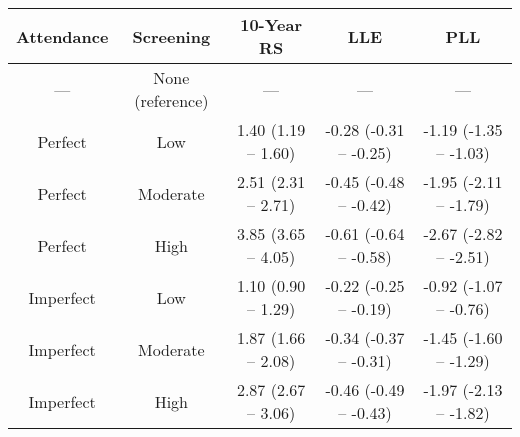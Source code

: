 
\begin{tabular}{ccccc}
\toprule
Attendance & Screening & 10-Year RS & LLE & PLL\\
\midrule
--- & None (reference) & --- & --- & ---\\
Perfect & Low & 1.40 (1.19 -- 1.60) & -0.28 (-0.31 -- -0.25) & -1.19 (-1.35 -- -1.03)\\
Perfect & Moderate & 2.51 (2.31 -- 2.71) & -0.45 (-0.48 -- -0.42) & -1.95 (-2.11 -- -1.79)\\
Perfect & High & 3.85 (3.65 -- 4.05) & -0.61 (-0.64 -- -0.58) & -2.67 (-2.82 -- -2.51)\\
Imperfect & Low & 1.10 (0.90 -- 1.29) & -0.22 (-0.25 -- -0.19) & -0.92 (-1.07 -- -0.76)\\
Imperfect & Moderate & 1.87 (1.66 -- 2.08) & -0.34 (-0.37 -- -0.31) & -1.45 (-1.60 -- -1.29)\\
Imperfect & High & 2.87 (2.67 -- 3.06) & -0.46 (-0.49 -- -0.43) & -1.97 (-2.13 -- -1.82)\\
\bottomrule
\end{tabular}

